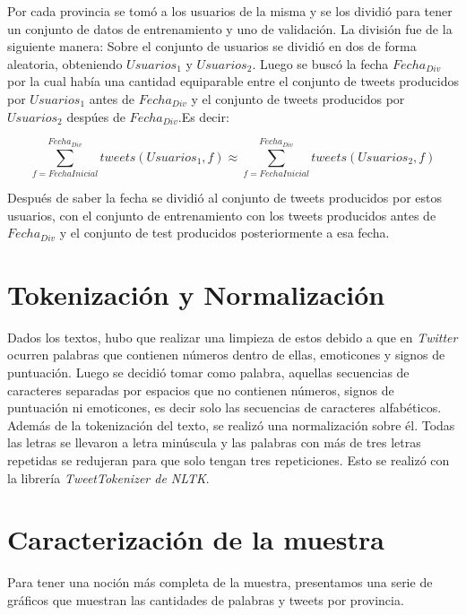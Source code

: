 Por cada provincia se tomó a los usuarios de la misma y se los dividió para tener un conjunto de datos de entrenamiento y uno de validación.
La división fue de la siguiente manera:
Sobre el conjunto de usuarios se dividió en dos de forma aleatoria, obteniendo $Usuarios_1$ y $Usuarios_2$. Luego se buscó la fecha $Fecha_{Div}$ por la cual había una cantidad equiparable entre el conjunto de tweets producidos por  $Usuarios_1$ antes de $Fecha_{Div}$ y el conjunto de tweets producidos por $Usuarios_2$ despúes de $Fecha_{Div}$.Es decir:

\begin{equation}
\sum_{ f = FechaInicial}^{Fecha_{Div}} tweets(Usuarios_1,f) \approx \sum_{ f = FechaInicial}^{Fecha_{Div}} tweets(Usuarios_2,f) 
\end{equation}

Después de saber la fecha se dividió al conjunto de tweets producidos por estos usuarios, con el conjunto de entrenamiento con los tweets producidos antes de $Fecha_{Div}$ y el conjunto de test producidos posteriormente a esa fecha.

\section{Tokenización y Normalización}

Dados los textos, hubo que realizar una limpieza de estos debido a que en \textit{Twitter} ocurren palabras que contienen números dentro de ellas, emoticones y signos de puntuación. Luego se decidió tomar como palabra, aquellas secuencias de caracteres separadas por espacios que no contienen números, signos de puntuación ni emoticones, es decir solo las secuencias de caracteres alfabéticos. 
Además de la tokenización del texto, se realizó una normalización sobre él. Todas las letras se llevaron a letra minúscula y las palabras con más de tres letras repetidas se redujeran para que solo tengan tres repeticiones. Esto se realizó con la librería \textit{TweetTokenizer de NLTK}. 

\section{Caracterización de la muestra}

Para tener una noción más completa de la muestra, presentamos una serie de gráficos que muestran las cantidades de palabras y tweets por provincia.

